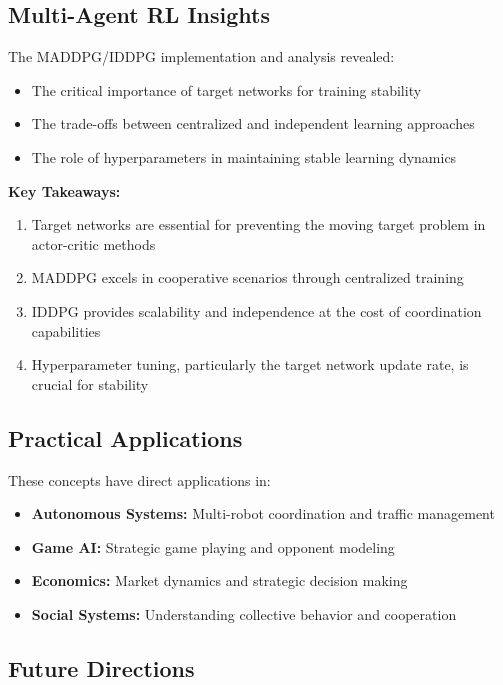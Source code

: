 \documentclass[12pt]{article}
\begin{document}
{{{{{{\subsection{Multi-Agent RL Insights}

The MADDPG/IDDPG implementation and analysis revealed:

\begin{itemize}
    \item The critical importance of target networks for training stability
    \item The trade-offs between centralized and independent learning approaches
    \item The role of hyperparameters in maintaining stable learning dynamics
\end{itemize}

\textbf{Key Takeaways:}
\begin{enumerate}
    \item Target networks are essential for preventing the moving target problem in actor-critic methods
    \item MADDPG excels in cooperative scenarios through centralized training
    \item IDDPG provides scalability and independence at the cost of coordination capabilities
    \item Hyperparameter tuning, particularly the target network update rate, is crucial for stability
\end{enumerate}

\subsection{Practical Applications}

These concepts have direct applications in:

\begin{itemize}
    \item \textbf{Autonomous Systems:} Multi-robot coordination and traffic management
    \item \textbf{Game AI:} Strategic game playing and opponent modeling
    \item \textbf{Economics:} Market dynamics and strategic decision making
    \item \textbf{Social Systems:} Understanding collective behavior and cooperation
\end{itemize}

\subsection{Future Directions}

}}}}}}
\end{document}
